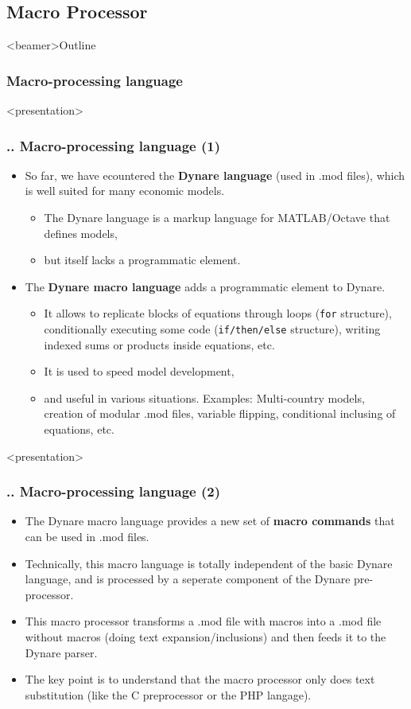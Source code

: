 \documentclass[11pt,aspectratio=169]{beamer}
\begin{document}
\subsection{Macro Processor}
\begin{frame}<beamer>{Outline}
	\tableofcontents[sectionstyle=hide/hide, subsectionstyle=show/shaded/hide, subsubsectionstyle=show/show/hide]
\end{frame}
\subsubsection{Macro-processing language}
\begin{frame}<presentation>
	\frametitle{{\thesection.\thesubsection.\thesubsubsection} Macro-processing language (1)}
	\begin{itemize}
		\justifying
		\item So far, we have ecountered the \textbf{Dynare language} (used in .mod files), which is well suited for many economic models. 
		\begin{itemize}
			\item The Dynare language is a markup language for MATLAB/Octave that defines models,
			\item but itself lacks a programmatic element.
		\end{itemize}
		\item The \textbf{Dynare macro language} adds a programmatic element to Dynare.
		\begin{itemize}
			\item It allows to replicate blocks of equations through loops (\texttt{for} structure), conditionally executing some code (\texttt{if/then/else} structure), writing indexed sums or products inside equations, etc.
			\item It is used to speed model development,
			\item and useful in various situations. Examples: Multi-country models, creation of modular .mod files, variable flipping, conditional inclusing of equations, etc.
		\end{itemize}
	\end{itemize}
\end{frame}
\begin{frame}<presentation>
	\frametitle{{\thesection.\thesubsection.\thesubsubsection} Macro-processing language (2)}
	\begin{itemize}
		\justifying
		\item The Dynare macro language provides a new set of \textbf{macro commands} that can be used in .mod files.
		\item Technically, this macro language is totally independent of the basic Dynare language, and is processed by a seperate component of the Dynare pre-processor.
		\item This macro processor transforms a .mod file with macros into a .mod file without macros (doing text expansion/inclusions) and then feeds it to the Dynare parser.
		\item The key point is to understand that the macro processor only does text substitution (like the C preprocessor or the PHP langage).
	\end{itemize}
\end{frame}
\end{document}
